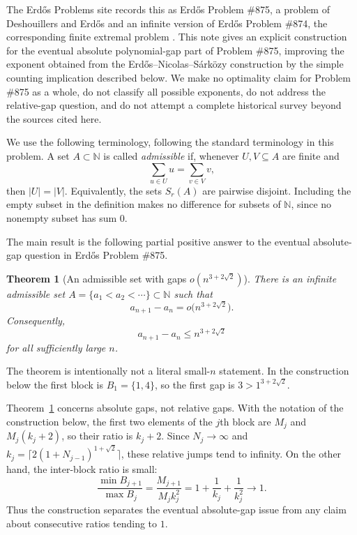 \documentclass[11pt]{article}
\newtheorem{theorem}{Theorem}
\newcommand{\N}{\mathbb{N}}
\begin{document}
The Erd\H{o}s Problems site records this as Erd\H{o}s Problem \#875, a problem of Deshouillers and Erd\H{o}s and an infinite version of Erd\H{o}s Problem \#874, the corresponding finite extremal problem \cite{Erdos1998,Bloom874,Bloom875}.  This note gives an explicit construction for the eventual absolute polynomial-gap part of Problem \#875, improving the exponent obtained from the Erd\H{o}s--Nicolas--S\'ark\"ozy construction by the simple counting implication described below.  We make no optimality claim for Problem \#875 as a whole, do not classify all possible exponents, do not address the relative-gap question, and do not attempt a complete historical survey beyond the sources cited here.

We use the following terminology, following the standard terminology in this problem.  A set $A\subset\N$ is called \emph{admissible} if, whenever $U,V\subseteq A$ are finite and
\[
        \sum_{u\in U}u=\sum_{v\in V}v,
\]
then $|U|=|V|$.  Equivalently, the sets $S_r(A)$ are pairwise disjoint.  Including the empty subset in the definition makes no difference for subsets of $\N$, since no nonempty subset has sum $0$.

The main result is the following partial positive answer to the eventual absolute-gap question in Erd\H{o}s Problem \#875.

\begin{theorem}[An admissible set with gaps $o(n^{3+2\sqrt2})$]\label{thm:main}
There is an infinite admissible set $A=\{a_1<a_2<\cdots\}\subset\N$ such that
\[
        a_{n+1}-a_n=o\bigl(n^{3+2\sqrt2}\bigr).
\]
Consequently,
\[
        a_{n+1}-a_n\le n^{3+2\sqrt2}
\]
for all sufficiently large $n$.
\end{theorem}

The theorem is intentionally not a literal small-$n$ statement.  In the construction below the first block is $B_1=\{1,4\}$, so the first gap is $3>1^{3+2\sqrt2}$.

Theorem~\ref{thm:main} concerns absolute gaps, not relative gaps.  With the notation of the construction below, the first two elements of the $j$th block are $M_j$ and $M_j(k_j+2)$, so their ratio is $k_j+2$.  Since $N_j\to\infty$ and $k_j=\lceil 2(1+N_{j-1})^{1+\sqrt2}\rceil$, these relative jumps tend to infinity.  On the other hand, the inter-block ratio is small:
\[
        \frac{\min B_{j+1}}{\max B_j}
        =\frac{M_{j+1}}{M_j k_j^2}
        =1+\frac1{k_j}+\frac1{k_j^2}
        \longrightarrow 1.
\]
Thus the construction separates the eventual absolute-gap issue from any claim about consecutive ratios tending to $1$.
\end{document}
